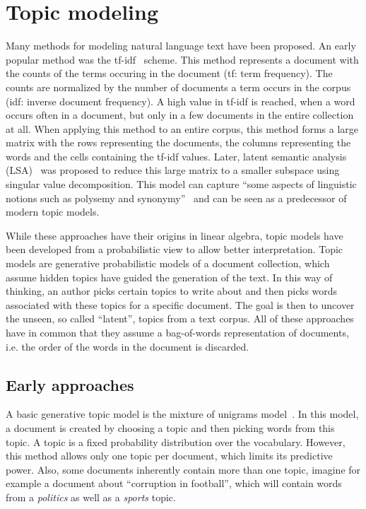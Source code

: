 \documentclass[
        a4paper,
        titlepage,
        twoside,
        parskip,
        numbers=noenddot
        ]{scrbook}
\theoremstyle{break}
\begin{document}
\section{Topic modeling}
Many methods for modeling natural language text have been proposed.
An early popular method was the tf-idf~\cite{SparckJones1972} scheme.
This method represents a document with the counts of the terms occuring in the document (tf: term frequency).
The counts are normalized by the number of documents a term occurs in the corpus (idf: inverse document frequency).
A high value in tf-idf is reached, when a word occurs often in a document, but only in a few documents in the entire collection at all.
When applying this method to an entire corpus, this method forms a large matrix with the rows representing the documents, the columns representing the words and the cells containing the tf-idf values.
Later, latent semantic analysis (LSA)~\cite{Deerwester1990} was proposed to reduce this large matrix to a smaller subspace using singular value decomposition.
This model can capture ``some aspects of linguistic notions such as polysemy and synonymy''~\cite{Blei2003} and can be seen as a predecessor of modern topic models.

While these approaches have their origins in linear algebra, topic models have been developed from a probabilistic view to allow better interpretation.
Topic models are generative probabilistic models of a document collection, which assume hidden topics have guided the generation of the text.
In this way of thinking, an author picks certain topics to write about and then picks words associated with these topics for a specific document.
The goal is then to uncover the unseen, so called ``latent'', topics from a text corpus.
All of these approaches have in common that they assume a bag-of-words representation of documents, i.e. the order of the words in the document is discarded.

\subsection{Early approaches}
A basic generative topic model is the mixture of unigrams model~\cite{Nigam2000}.
In this model, a document is created by choosing a topic and then picking words from this topic.
A topic is a fixed probability distribution over the vocabulary.
However, this method allows only one topic per document, which limits its predictive power.
Also, some documents inherently contain more than one topic, imagine for example a document about ``corruption in football'', which will contain words from a \emph{politics} as well as a \emph{sports} topic.
\end{document}
